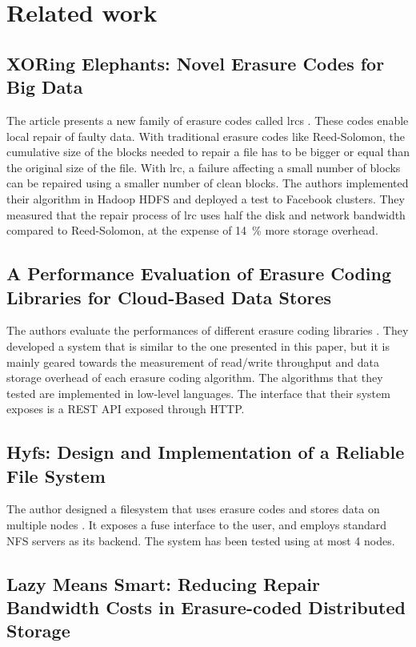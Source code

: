 \section{Related work}

\subsection{XORing Elephants: Novel Erasure Codes for Big Data}

The article presents a new family of erasure codes called \acp{lrc} \autocite{XorbasVLDB}.
These codes enable local repair of faulty data.
With traditional erasure codes like Reed-Solomon, the cumulative size of the blocks needed to repair a file has to be bigger or equal than the original size of the file.
With \ac{lrc}, a failure affecting a small number of blocks can be repaired using a smaller number of clean blocks.
The authors implemented their algorithm in Hadoop HDFS and deployed a test to Facebook clusters.
They measured that the repair process of \ac{lrc} uses half the disk and network bandwidth compared to Reed-Solomon, at the expense of \SI{14}{\percent} more storage overhead.

\subsection{A Performance Evaluation of Erasure Coding Libraries for Cloud-Based Data Stores}

The authors evaluate the performances of different erasure coding libraries \autocite{Burihabwa2016}.
They developed a system that is similar to the one presented in this paper, but it is mainly geared towards the measurement of read/write throughput and data storage overhead of each erasure coding algorithm.
The algorithms that they tested are implemented in low-level languages.
The interface that their system exposes is a REST API exposed through HTTP.

\subsection{Hyfs: Design and Implementation of a Reliable File System}

The author designed a filesystem that uses erasure codes and stores data on multiple nodes \autocite{hyfs}.
It exposes a \ac{fuse} interface to the user, and employs standard NFS servers as its backend.
The system has been tested using at most 4 nodes.

\subsection{Lazy Means Smart: Reducing Repair Bandwidth Costs in Erasure-coded Distributed Storage}

